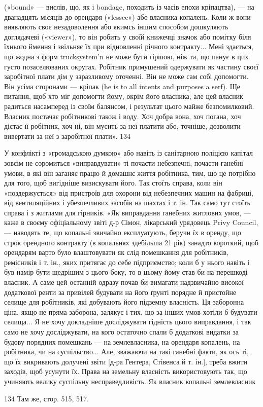 («bound» — вислів, що, як і bondage, походить із часів епохи
кріпацтва), — на дванадцять місяців до орендаря («lessee») або
власника копалень. Коли ж вони виявляють своє незадоволення
або якимсь іншим способом дошкуляють доглядачеві («viewer»),
то він робить у своїй книжечці значок або помітку біля їхнього
ймення і звільняє їх при відновленні річного контракту... Мені
здається, що жодна з форм trucksystem’n не може бути гіршою,
ніж та, що панує в цих густо позаселюваних округах. Робітник
примушений одержувати як частину своєї заробітної плати дім
у заразливому оточенні. Він не може сам собі допомогти. Він
усіма сторонами — кріпак (he is to all intents and purposes a
serf). Ще питання, щоб хто міг допомогти йому, окрім його власника,
але цей власник радиться насамперед із своїм балянсом,
і результат цього майже безпомилковий. Власник постачає робітникові
також і воду. Хоч добра вона, хоч погана, хоч дістає
її робітник, хоч ні, він мусить за неї платити або, точніше, дозволити
вивертати за неї з заробітної плати». 134

У конфлікті з «громадською думкою» або навіть із санітарною
поліцією капітал зовсім не соромиться «виправдувати»
ті почасти небезпечні, почасти ганебні умови, в які він заганяє
працю й домашнє життя робітника, тим, що це потрібно для того,
щоб вигідніше визискувати його. Так стоїть справа, коли він
«поздержується» від пристроїв для охорони від небезпечних машин
на фабриці, від вентиляційних і убезпечливих засобів на шахтах
і т. ін. Так само тут стоїть справа і з житлами для гірників. «Як
виправдання ганебних житлових умов, — каже в своєму офіціальному
звіті д-р Сімон, лікарський урядовець Privy Council, —
наводять те, що копальні звичайно експлуатують, беручи їх в
оренду, що строк орендного контракту (в копальнях здебільша
21 рік) занадто короткий, щоб орендарям варто було влаштовувати
як слід помешкання для робітників, ремісників і т. ін.,
яких притягає до себе підприємство; коли б у нього навіть і був
намір бути щедрішим з цього боку, то в цьому йому став би на
перешкоді власник. А саме цей останній одразу почав би вимагати
надзвичайно високої додаткової ренти за привілей будувати
на його ґрунті порядне й пристойне селище для робітників,
які добувають його підземну власність. Ця заборонна ціна, якщо
не пряма заборона, залякує і тих, що за інших умов хотіли б
будувати селища... Я не хочу докладніше досліджувати гідність
цього виправдання, і так само не хочу досліджувати, на кого
остаточно спали б додаткові видатки за будову порядних помешкань
— на землевласника, на орендаря копалень, на робітника,
чи на суспільство... Але, зважаючи на такі ганебні факти, як
ось ті, що їх викривають долучені звіти [д-ра Гентера, Стівенса
й т. ін.], треба вжити заходів, щоб усунути їх. Права
на земельну власність використовують так, що учиняють велику
суспільну несправедливість. Як власник копальні землевласник

134 Там же, стор. 515, 517.
